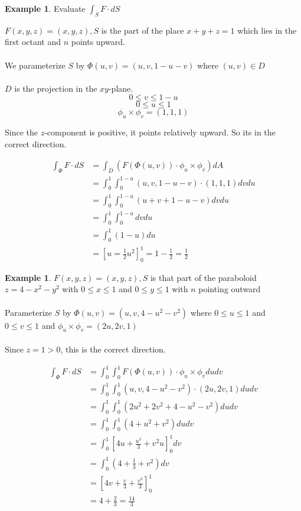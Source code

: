 \documentclass[12pt]{article}
\theoremstyle{plain}
\theoremstyle{definition}
\newtheorem{example}[theorem]{Example}
\begin{document}
\begin{example}
	Evaluate $\int_S F \cdot dS$

	$F(x,y,z) = (x,y,z), S$ is the part of the place $x+y+z=1$ which lies in the first octant and $n$ points upward.\\
	\\
	We parameterize $S$ by $\Phi (u,v) = (u,v, 1-u-v)$ where $(u,v)\in D$\\
	\\
	$D$ is the projection in the $xy$-plane.
	$$0 \leq v \leq 1-u$$
	$$0 \leq u \leq 1$$
	$$\phi_u \times \phi_v = (1,1,1)$$

	Since the $z$-component is positive, it points relatively upward. So its in the correct direction.

	\begin{align*}
		\int_\Phi F \cdot dS &= \int_D (F(\Phi (u,v)) \cdot \phi_u \times \phi_v) dA\\
		&= \int_0^1 \int_0^{1-u} (u,v,1-u-v) \cdot (1,1,1) dv du\\
		&= \int_0^1 \int_0^{1-u} (u+v+1-u-v) dv du\\
		&=\int_0^1 \int_0^{1-u} dv du\\
		&= \int_0^1 (1-u) du\\
		&= [u=\frac{1}{2}u^2]_0^1 = 1 - \frac{1}{2} = \frac{1}{2}
	\end{align*}



\end{example}

\begin{example}
	$F(x,y,z) = (x,y,z), S$ is that part of the paraboloid $z=4-x^2-y^2$ with $0 \leq x \leq 1$ and $0 \leq y \leq 1$ with $n$ pointing outward\\
	\\
	Parameterize $S$ by $\Phi (u,v) = (u,v, 4-u^2-v^2)$ where $0 \leq u \leq 1$ and $0 \leq v \leq 1$ and $\phi_u \times \phi_v = (2u, 2v, 1)$\\
	\\
	Since $z=1 > 0$, this is the correct direction.

	\begin{align*}
		\int_\Phi F \cdot dS &= \int_0^1 \int_0^1 F(\Phi (u,v)) \cdot \phi_u \times \phi_v dudv\\
		&= \int_0^1 \int_0^1 (u,v,4-u^2-v^2) \cdot (2u, 2v, 1) dudv\\
		&= \int_0^1 \int_0^1 (2u^2 + 2v^2 + 4-u^2-v^2)dudv\\
		&= \int_0^1 \int_0^1 (4+u^2+v^2) dudv\\
		&= \int_0^1 [4u+ \frac{u^3}{3} + v^2 u]^1_0 dv\\
		&= \int_0^1 (4+\frac{1}{3} + v^2)dv\\
		&=[4v + \frac{v}{3} + \frac{v^3}{3}]_0^1\\
		&= 4 + \frac{2}{3} = \frac{14}{3}
	\end{align*}

\end{example}
\end{document}
